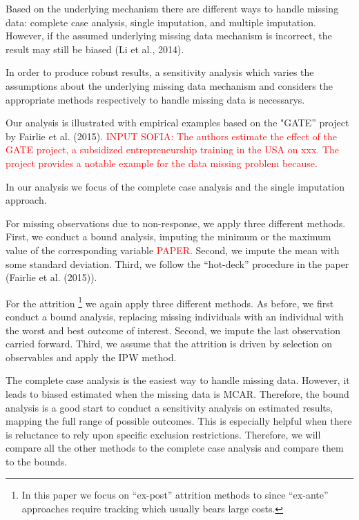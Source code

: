 Based on the underlying mechanism there are different ways to handle missing data: complete case analysis, single imputation, and multiple imputation. However, if the assumed underlying missing data mechanism is incorrect, the result may still be biased (Li et al., 2014).

In order to produce robust results, a sensitivity analysis which varies the assumptions about the underlying missing data mechanism and considers the appropriate methods respectively to handle missing data is necessarys.

Our analysis is illustrated with empirical examples based on the "\ac{GATE}'' project by Fairlie et al. (2015). \textcolor{red}{INPUT SOFIA: The authors estimate the effect of the \ac{GATE} project, a subsidized entrepreneurship training in the USA on xxx. The project provides a notable example for the data missing problem because}.

In our analysis we focus of the complete case analysis and the single imputation approach.

For missing observations due to non-response, we apply three different methods. First, we conduct a bound analysis, imputing the minimum or the maximum value of the corresponding variable \textcolor{red}{PAPER}. Second, we impute the mean with some standard deviation.
Third, we follow the ``hot-deck'' procedure in the paper (Fairlie et al. (2015)).

For the attrition \footnote{In this paper we focus on ``ex-post'' attrition methods to  since ``ex-ante'' approaches require tracking which usually bears large costs.} we again apply three different methods. As before, we first conduct a bound analysis, replacing missing individuals with an individual with the worst and best outcome of interest. Second, we impute the last observation carried forward. Third, we assume that the attrition is driven by selection on observables and apply the \ac{IPW} method.

The complete case analysis is the easiest way to handle missing data. However, it leads to biased estimated when the missing data is \ac{MCAR}. Therefore, the bound analysis is a good start to conduct a sensitivity analysis on estimated results, mapping the full range of possible outcomes. This is especially helpful when there is reluctance to rely upon speciﬁc exclusion restrictions. Therefore, we will compare all the other methods to the complete case analysis and compare them to the bounds.
